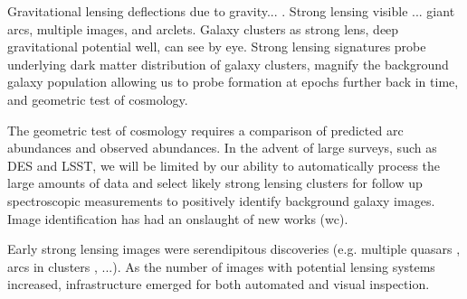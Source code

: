 \documentclass{emulateapj}
\begin{document}
Gravitational lensing deflections due to gravity... \citep[see][for a
  review]{kneibandnatarajan_11}.  Strong lensing visible ... giant
arcs, multiple images, and arclets.  Galaxy clusters as strong lens,
deep gravitational potential well, can see by eye.  Strong lensing
signatures probe underlying dark matter distribution of galaxy
clusters, magnify the background galaxy population allowing us to
probe formation at epochs further back in time, and geometric test of
cosmology.

The geometric test of cosmology requires a comparison of predicted arc
abundances and observed abundances.  In the advent of large surveys,
such as DES and LSST, we will be limited by our ability to
automatically process the large amounts of data and select likely
strong lensing clusters for follow up spectroscopic measurements to
positively identify background galaxy images.  Image identification
has had an onslaught of new works (wc).

Early strong lensing images were serendipitous discoveries
(e.g. multiple quasars \citep{walsh_etal79}, arcs in clusters
\citep{lyndsandpetrosian_86}, ...).  As the number of images with
potential lensing systems increased, infrastructure emerged for both
automated and visual inspection.  

\end{document}
